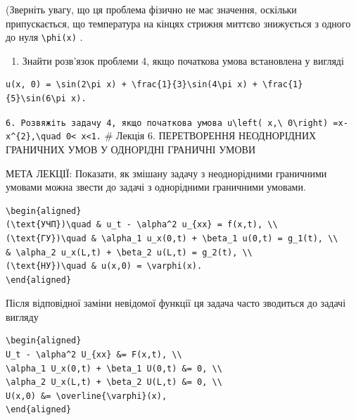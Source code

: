 \documentclass[
  ukrainian,
]{article}
\providecommand{\tightlist}{%
  \setlength{\itemsep}{0pt}\setlength{\parskip}{0pt}}
\begin{document}
(Зверніть увагу, що ця проблема фізично не має значення, оскільки
припускається, що температура на кінцях стрижня миттєво знижується з
одного до нуля \texttt{\textbackslash{}phi(x)} .

\begin{enumerate}
\def\labelenumi{\arabic{enumi}.}
\setcounter{enumi}{4}
\tightlist
\item
  Знайти розв'язок проблеми 4, якщо початкова умова встановлена у
  вигляді
\end{enumerate}

\begin{verbatim}
u(x, 0) = \sin(2\pi x) + \frac{1}{3}\sin(4\pi x) + \frac{1}{5}\sin(6\pi x).
\end{verbatim}

\texttt{6.\ Розв\textquotesingle{}яжіть\ задачу\ 4,\ якщо\ початкова\ умова\ \textquotesingle{}u\textbackslash{}left(\ x,\textbackslash{}\ 0\textbackslash{}right)\ =x-x\^{}\{2\},\textbackslash{}quad\ 0\textless{}\ x\textless{}1.\textquotesingle{}}
\# Лекція 6. ПЕРЕТВОРЕННЯ НЕОДНОРІДНИХ ГРАНИЧНИХ УМОВ У ОДНОРІДНІ
ГРАНИЧНІ УМОВИ

МЕТА ЛЕКЦІЇ: Показати, як змішану задачу з неоднорідними граничними
умовами можна звести до задачі з однорідними граничними умовами.

\begin{verbatim}
\begin{aligned}
(\text{УЧП})\quad & u_t - \alpha^2 u_{xx} = f(x,t), \\
(\text{ГУ})\quad & \alpha_1 u_x(0,t) + \beta_1 u(0,t) = g_1(t), \\
& \alpha_2 u_x(L,t) + \beta_2 u(L,t) = g_2(t), \\
(\text{НУ})\quad & u(x,0) = \varphi(x).
\end{aligned}
\end{verbatim}

Після відповідної заміни невідомої функції ця задача часто зводиться до
задачі вигляду

\begin{verbatim}
\begin{aligned}
U_t - \alpha^2 U_{xx} &= F(x,t), \\
\alpha_1 U_x(0,t) + \beta_1 U(0,t) &= 0, \\
\alpha_2 U_x(L,t) + \beta_2 U(L,t) &= 0, \\
U(x,0) &= \overline{\varphi}(x),
\end{aligned}
\end{verbatim}
\end{document}
